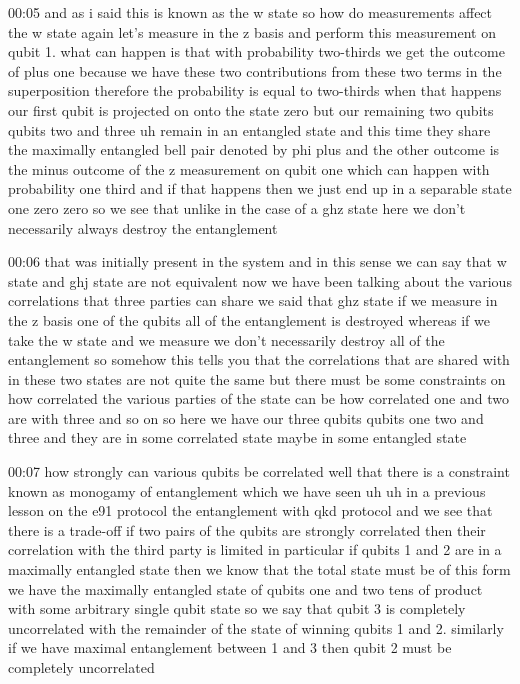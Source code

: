 00:05
and as i said this is known as the w state so how do measurements affect the w
state again let's measure in the z basis and
perform this measurement on qubit 1. what can happen is that with probability
two-thirds we get the outcome of plus one because we have
these two contributions from these two terms in the superposition
therefore the probability is equal to two-thirds
when that happens our first qubit is projected on
onto the state zero but our remaining two qubits qubits two and three
uh remain in an entangled state and this time they share
the maximally entangled bell pair denoted by phi plus
and the other outcome is the minus outcome of the z measurement on qubit one
which can happen with probability one third and if that happens
then we just end up in a separable state one zero zero
so we see that unlike in the case of a ghz state
here we don't necessarily always destroy the entanglement

00:06
that was initially present in the system and in this sense we can say that w
state and ghj state are not equivalent now
we have been talking about the various correlations that three parties can
share we said that ghz state if we measure in the z basis one of the qubits
all of the entanglement is destroyed whereas if we take the w state and we
measure we don't necessarily destroy all of the entanglement so somehow
this tells you that the correlations that are shared
with in these two states are not quite the same but there must be some
constraints on how correlated the various parties
of the state can be how correlated one and two are with three and so on
so here we have our three qubits qubits one two and three and they are in some
correlated state maybe in some entangled state

00:07
how strongly can various qubits be correlated well
that there is a constraint known as monogamy of entanglement which we have seen
uh uh in a previous lesson on the e91 protocol the entanglement with qkd
protocol and we see that there is a trade-off if
two pairs of the qubits are strongly correlated
then their correlation with the third party is limited
in particular if qubits 1 and 2 are in a maximally entangled state
then we know that the total state must be of this form
we have the maximally entangled state of qubits one and two
tens of product with some arbitrary single qubit state so we say that qubit 3 is
completely uncorrelated with the remainder of the state of
winning qubits 1 and 2. similarly if we have maximal
entanglement between 1 and 3 then qubit 2 must be completely uncorrelated

